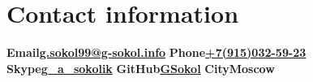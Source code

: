 \documentclass[10pt, a4paper, english]{article}
\begin{document}
\section* {Contact information}
\textbf{Email}\textbf{\href{mailto:g.sokol99@g-sokol.info}{g.sokol99@g-sokol.info}}\newline
\textbf{Phone}\textbf{\href{tel:+7(915)032-59-23}{+7(915)032-59-23}}\newline
\textbf{Skype}\textbf{\href{skype:g\_a\_sokolik?call}{g\_a\_sokolik}}\newline
\textbf{GitHub}\textbf{\href{https://github.com/GSokol}{GSokol}}\newline
\textbf{City}\textbf{Moscow}\newline
\end{document}
